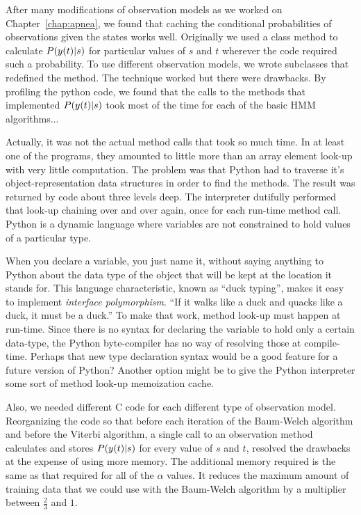 After many modifications of observation models as we worked on
Chapter~\ref{chap:apnea}, we found that caching the conditional
probabilities of observations given the states works well.  Originally
we used a class method to calculate $P({y}{(t)}|s)$ for particular
values of $s$ and $t$ wherever the code required such a probability.
To use different observation models, we wrote subclasses that
redefined the method.  The technique worked but there were drawbacks.
By profiling the python code, we found that the calls to the methods
that implemented $P({y}{(t)}|s)$ took most of the time for each of
the basic HMM algorithms$\ldots$

Actually, it was not the actual method calls that took so much time.
In at least one of the programs, they amounted to little more than an
array element look-up with very little computation.  The problem was
that Python had to traverse it's object-representation data structures
in order to find the methods.  The result was returned by code about
three levels deep.  The interpreter dutifully performed that look-up
chaining over and over again, once for each run-time method call.
Python is a dynamic language where variables are not constrained to
hold values of a particular type.

When you declare a variable, you just name it, without saying anything
to Python about the data type of the object that will be kept at the
location it stands for.  This language characteristic, known as ``duck
typing'', makes it easy to implement \emph{interface polymorphism}.
``If it walks like a duck and quacks like a duck, it must be a duck.''
To make that work, method look-up must happen at run-time.  Since
there is no syntax for declaring the variable to hold only a certain
data-type, the Python byte-compiler has no way of resolving those at
compile-time.  Perhaps that new type declaration syntax would be a
good feature for a future version of Python?  Another option might be
to give the Python interpreter some sort of method look-up memoization
cache.

Also, we needed different C code for each different type of
observation model.  Reorganizing the code so that before each
iteration of the Baum-Welch algorithm and before the Viterbi
algorithm, a single call to an observation method calculates and
stores $P({y}{(t)}|s)$ for every value of $s$ and $t$, resolved the
drawbacks at the expense of using more memory.  The additional memory
required is the same as that required for all of the $\alpha$ values.
It reduces the maximum amount of training data that we could use with
the Baum-Welch algorithm by a multiplier between $\frac{2}{3}$ and
$1$.



